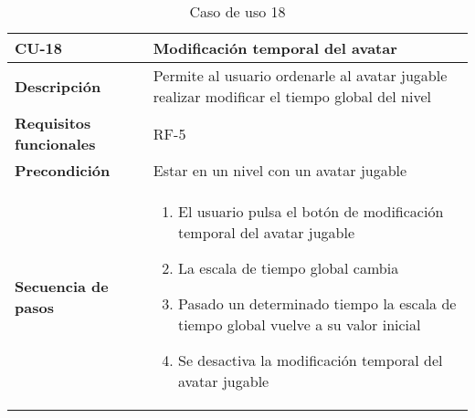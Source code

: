 \begin{longtable}{l|l}
\caption{Caso de uso 18}\\
\begin{minipage}{0.25\columnwidth}
\textbf{CU-18} 
\end{minipage}
&
\begin{minipage}{0.65\columnwidth}
Modificación temporal del avatar
\end{minipage}
\\ \hline

\begin{minipage}{0.25\columnwidth}
\textbf{Descripción} 
\end{minipage}
&
\begin{minipage}{0.65\columnwidth}
Permite al usuario ordenarle al avatar jugable realizar modificar el tiempo global del nivel
\end{minipage}
\\ \hline

\begin{minipage}{0.25\columnwidth}
\textbf{Requisitos funcionales} 
\end{minipage}
&
\begin{minipage}{0.65\columnwidth}
RF-5
\end{minipage}
\\ \hline

\begin{minipage}{0.25\columnwidth}
\textbf{Precondición} 
\end{minipage}
&
\begin{minipage}{0.65\columnwidth}
Estar en un nivel con un avatar jugable
\end{minipage}
\\ \hline

\begin{minipage}{0.25\columnwidth}
\textbf{Secuencia de pasos} 
\end{minipage}
&
\begin{minipage}{0.65\columnwidth}
\begin{enumerate}
\item
El usuario pulsa el botón de modificación temporal del avatar jugable
\item
La escala de tiempo global cambia
\item
Pasado un determinado tiempo la escala de tiempo global vuelve a su valor inicial
\item
Se desactiva la modificación temporal del avatar jugable
\end{enumerate}
\end{minipage}
\\ \hline


\end{longtable}
